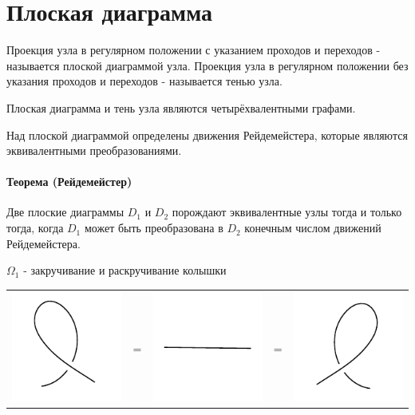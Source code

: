 \section{Плоская диаграмма}

Проекция узла в регулярном положении с указанием проходов и переходов - называется плоской диаграммой узла.
Проекция узла в регулярном положении без указания проходов и переходов - называется тенью узла. 

Плоская диаграмма и тень узла являются четырёхвалентными графами.

Над плоской диаграммой определены движения Рейдемейстера, которые являются эквивалентными преобразованиями.

\paragraph{Теорема (Рейдемейстер)} Две плоские диаграммы $D_1$ и $D_2$ порождают эквивалентные узлы тогда и только тогда, когда $D_1$ может быть преобразована в $D_2$ конечным числом движений Рейдемейстера.



\graphicspath{{\currentpath}}

$\Omega_1$ - закручивание и раскручивание колышки

\begin{tabular}{
>{\centering\arraybackslash}m{3cm}>{\centering\arraybackslash}m{0.4cm}
>{\centering\arraybackslash}m{3cm}>{\centering\arraybackslash}m{0.4cm}
>{\centering\arraybackslash}m{3cm}
}
\includegraphics{images/close-loop-l.pdf}
&
=
&
\includegraphics{images/line.pdf}
&
=
&
\includegraphics{images/close-loop-r.pdf}
\end{tabular}

